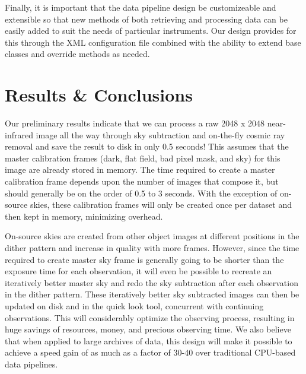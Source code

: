 Finally, it is important that the data pipeline design be customizeable and
extensible so that new methods of both retrieving and processing data can be
easily added to suit the needs of particular instruments.  Our design provides
for this through the XML configuration file combined with the ability to
extend base classes and override methods as needed. 

\section{Results \& Conclusions}

Our preliminary results indicate that we can process a raw 2048 x 2048
near-infrared image all the way through sky subtraction and on-the-fly cosmic
ray removal and save the result
to disk in only 0.5 seconds!  This assumes that the master calibration frames
(dark, flat field, bad pixel mask, and sky) for this image are already stored
in memory.  The time required to create a master calibration frame depends
upon the number of images that compose it, but should generally be on the
order of 0.5 to 3 seconds.  With the exception of on-source skies, these
calibration frames will only be created once per dataset and then kept in
memory, minimizing overhead.

On-source skies are created from other object images at different positions
in the dither pattern and increase in quality with more frames.  However,
since the time required to create master sky frame is generally going to be
shorter than the exposure time for each observation, it will even be
possible to recreate an iteratively better master sky and redo the sky
subtraction after each observation in the dither pattern.  These iteratively
better sky subtracted images can then be updated on disk and in the
quick look tool, concurrent with continuing observations.  This will
considerably optimize the observing process, resulting in huge savings of
resources, money, and precious observing time.  We also believe that when
applied to large archives of data, this design will make it possible to
achieve a speed gain of as much as a factor of 30-40 over traditional
CPU-based data pipelines. 
